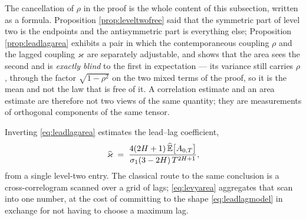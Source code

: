 \begin{remark}\label{rem:rhocancels}
The cancellation of $\rho$ in the proof is the whole content of this subsection, written as a
formula. Proposition \ref{prop:leveltwofree} said that the symmetric part of level two is the
endpoints and the antisymmetric part is everything else; Proposition \ref{prop:leadlagarea} exhibits
a pair in which the contemporaneous coupling $\rho$ and the lagged coupling $\varkappa$ are separately
adjustable, and shows that the area sees the second and is \emph{exactly blind} to the first in
expectation --- its variance still carries $\rho$, through the factor $\sqrt{1-\rho^{2}}$ on the two
mixed terms of the proof, so it is the mean and not the law that is free of it. A
correlation estimate and an area estimate are therefore not two views of the same quantity; they are
measurements of orthogonal components of the same tensor.

Inverting \eqref{eq:leadlagarea} estimates the lead--lag coefficient,
\[
  \widehat{\varkappa}\;=\;\frac{4(2H+1)\,\widehat{\mathbb{E}}\bigl[A_{0,T}\bigr]}
  {\sigma_{1}(3-2H)\,T^{2H+1}},
\]
from a single level-two entry. The classical route to the same conclusion is a cross-correlogram
scanned over a grid of lags; \eqref{eq:levyarea} aggregates that scan into one number, at the cost of
committing to the shape \eqref{eq:leadlagmodel} in exchange for not having to choose a maximum lag.
\end{remark}


